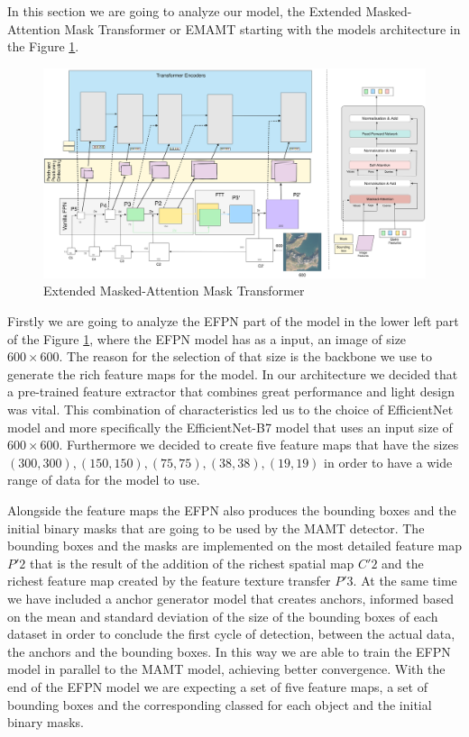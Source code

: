 In this section we are going to analyze our model, the Extended Masked-Attention Mask Transformer or EMAMT starting with the models architecture in the Figure
\ref{fig:emamt}.

\begin{figure}[h!]
    \includegraphics[scale=0.05]{Figures/EMAMT.png}
    \caption{Extended Masked-Attention Mask Transformer}
    \label{fig:emamt}
\end{figure}

Firstly we are going to analyze the EFPN part of the model in the lower left part of the Figure \ref{fig:emamt}, where the EFPN model has as a input,
an image of size $600 \times 600$. The reason for the selection of that size is the backbone we use to generate the rich feature maps for the model.
In our architecture we decided that a pre-trained feature extractor that combines great performance and light design was vital. This combination of characteristics
led us to the choice of EfficientNet \cite{efficient} model and more specifically the EfficientNet-B7 model that uses an input size of $600 \times 600$. Furthermore we decided 
to create five feature maps that have the sizes $(300, 300), (150, 150), (75, 75), (38, 38), (19, 19)$ in order to have a wide range of data for the model to use. 

Alongside the feature maps the EFPN also produces the bounding boxes and the initial binary masks that are going to be used by the MAMT detector. The 
bounding boxes and the masks are implemented on the most detailed feature map $P'2$ that is the result of the addition of the richest spatial map $C'2$ 
and the richest feature map created by the feature texture transfer $P'3$. At the same time we have included a anchor generator model that creates anchors, 
informed based on the mean and standard deviation of the size of the bounding boxes of each dataset in order to conclude the first cycle of detection, between the 
actual data, the anchors and the bounding boxes. In this way we are able to train the EFPN model in parallel to the MAMT model, achieving better convergence.
With the end of the EFPN model we are expecting a set of five  feature maps, a set of bounding boxes and the corresponding classed for each object 
and the initial binary masks. 

